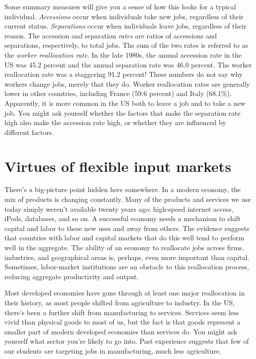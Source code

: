 Some summary measures will give you a sense of how this looks for
a typical individual.  {\it Accessions\/} occur when individuals
take new jobs, regardless of their current status. {\it
Separations\/} occur when individuals leave jobs, regardless of their
reason. The accession and separation {\it rates\/} are ratios of
accessions and separations, respectively, to total jobs.  The sum
of the two rates is referred to as the \textit{worker reallocation
rate}. In the late 1980s, the annual accession rate in the US was
45.2 percent and the annual separation rate was 46.0 percent.  The worker
reallocation rate was a staggering 91.2 percent! These numbers do not
say why workers change jobs, merely that they do.
Worker reallocation rates are
generally lower in other countries, including France (59.6 percent) and
Italy (68.1\%). Apparently, it is more common in the US both to
leave a job and to take a new job.
You might ask yourself whether the factors that make the separation rate
high also make the accession rate high, or whether they are
influenced by different factors.


\section{Virtues of flexible input markets}


There's a big-picture point hidden here somewhere.
In a modern economy, the mix of products is changing constantly.
Many of the products and services we use today
simply weren't available twenty years ago:
high-speed internet access, iPods, databases, and so on.
A successful economy needs a mechanism to shift
capital and labor to these new uses and away from others.
The evidence suggests that countries with labor and capital markets
that do this well tend to perform well in the aggregate.
The ability of an economy to reallocate jobs across
firms, industries, and geographical areas is,
perhaps, even more important than capital.
Sometimes, labor-market institutions are an obstacle to this
reallocation process,
reducing aggregate productivity and output.


Most developed economies have gone through at least one
major reallocation in their history,
as most people shifted from agriculture to industry.
In the US, there's been a further shift from manufacturing to services.
Services seem less vivid than physical goods to most of us,
but the fact is that goods represent a smaller part of modern
developed economies than services do.
You might ask yourself what sector you're likely to go into.
Past experience suggests that few of our students are targeting jobs
in manufacturing, much less agriculture.

